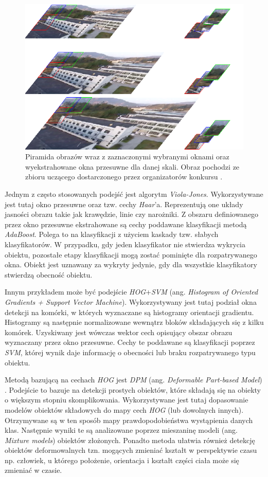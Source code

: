 \begin{figure}
    \centering
    \includegraphics[width=0.9\linewidth]{images/piramid.png}
    \caption{Piramida obrazów wraz z zaznaczonymi wybranymi oknami oraz wyekstrahowane okna przesuwne dla danej skali. Obraz pochodzi ze zbioru uczącego dostarczonego przez organizatorów konkursu \cite{dac_sdc_2021}.}
    \label{fig:sliding_window}
\end{figure}


Jednym z często stosowanych podejść jest algorytm \emph{Viola-Jones}\cite{viola_jones}. 
Wykorzystywane jest tutaj okno przesuwne oraz tzw. cechy \emph{Haar}'a.
Reprezentują one układy jasności obrazu takie jak krawędzie, linie czy narożniki. 
Z obszaru definiowanego przez okno przesuwne ekstrahowane są cechy poddawane klasyfikacji metodą \emph{AdaBoost}.
Polega to na klasyfikacji z użyciem kaskady tzw. słabych klasyfikatorów.
W przypadku, gdy jeden klasyfikator nie stwierdza wykrycia obiektu, pozostałe etapy klasyfikacji mogą zostać pominięte dla rozpatrywanego okna.
Obiekt jest uznawany za wykryty jedynie, gdy dla wszystkie klasyfikatory stwierdzą obecność obiektu. 

Innym przykładem może być podejście \emph{HOG}+\emph{SVM}\cite{hog} (ang. \emph{Histogram of Oriented Gradients + Support Vector Machine}). 
Wykorzystywany jest tutaj podział okna detekcji na komórki, w których wyznaczane są histogramy orientacji gradientu. 
Histogramy są następnie normalizowane wewnątrz bloków składających się z kilku komórek. 
Uzyskiwany jest wówczas wektor cech opisujący obszar obrazu wyznaczany przez okno przesuwne. 
Cechy te poddawane są klasyfikacji poprzez \emph{SVM}, której wynik daje informację o obecności lub braku rozpatrywanego typu obiektu.

Metodą bazującą na cechach \emph{HOG} jest \emph{DPM} (ang. \emph{Deformable Part-based Model}) \cite{model_based}.
Podejście to bazuje na detekcji prostych obiektów, które składają się na obiekty o większym stopniu skomplikowania.
Wykorzystywane jest tutaj dopasowanie modelów obiektów składowych do mapy cech \emph{HOG} (lub dowolnych innych).
Otrzymywane są w ten sposób mapy prawdopodobieństwa wystąpienia danych klas.
Następnie wyniki te są analizowane poprzez mieszaninę modeli (ang. \emph{Mixture models}) obiektów złożonych.
Ponadto metoda ułatwia również detekcję obiektów deformowalnych tzn. mogących zmieniać kształt w perspektywie czasu np. człowiek, u którego położenie, orientacja i kształt części ciała może się zmieniać w czasie.


